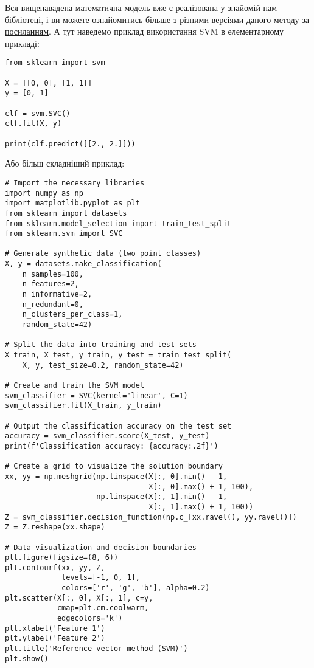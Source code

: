 \documentclass[]{article}
\begin{document}
Вся вищенавадена математична модель вже є реалізована у знайомій нам бібліотеці, і ви можете ознайомитись більше з різними версіями даного методу за \href{https://scikit-learn.org/stable/modules/svm.html}{посиланням}. А тут наведемо приклад використання SVM в елементарному прикладі:

\begin{verbatim}
from sklearn import svm

X = [[0, 0], [1, 1]]
y = [0, 1]

clf = svm.SVC()
clf.fit(X, y)

print(clf.predict([[2., 2.]]))
\end{verbatim}


Або більш складніший приклад:

\begin{verbatim}
# Import the necessary libraries
import numpy as np
import matplotlib.pyplot as plt
from sklearn import datasets
from sklearn.model_selection import train_test_split
from sklearn.svm import SVC

# Generate synthetic data (two point classes)
X, y = datasets.make_classification(
    n_samples=100,
    n_features=2,
    n_informative=2,
    n_redundant=0,
    n_clusters_per_class=1,
    random_state=42)

# Split the data into training and test sets
X_train, X_test, y_train, y_test = train_test_split(
    X, y, test_size=0.2, random_state=42)

# Create and train the SVM model
svm_classifier = SVC(kernel='linear', C=1)
svm_classifier.fit(X_train, y_train)

# Output the classification accuracy on the test set
accuracy = svm_classifier.score(X_test, y_test)
print(f'Classification accuracy: {accuracy:.2f}')

# Create a grid to visualize the solution boundary
xx, yy = np.meshgrid(np.linspace(X[:, 0].min() - 1,
                                 X[:, 0].max() + 1, 100),
                     np.linspace(X[:, 1].min() - 1,
                                 X[:, 1].max() + 1, 100))
Z = svm_classifier.decision_function(np.c_[xx.ravel(), yy.ravel()])
Z = Z.reshape(xx.shape)

# Data visualization and decision boundaries
plt.figure(figsize=(8, 6))
plt.contourf(xx, yy, Z,
             levels=[-1, 0, 1],
             colors=['r', 'g', 'b'], alpha=0.2)
plt.scatter(X[:, 0], X[:, 1], c=y,
            cmap=plt.cm.coolwarm,
            edgecolors='k')
plt.xlabel('Feature 1')
plt.ylabel('Feature 2')
plt.title('Reference vector method (SVM)')
plt.show()
\end{verbatim}
\end{document}
